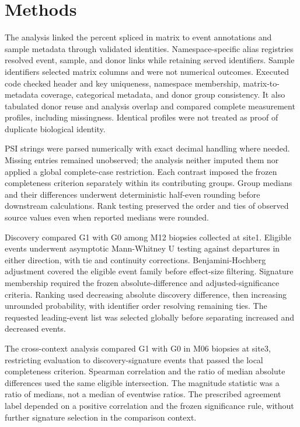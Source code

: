 \documentclass[10pt,a4paper]{article}
\begin{document}
\section*{Methods}
The analysis linked the percent spliced in matrix to event annotations and sample metadata through validated identities. Namespace-specific alias registries resolved event, sample, and donor links while retaining served identifiers. Sample identifiers selected matrix columns and were not numerical outcomes. Executed code checked header and key uniqueness, namespace membership, matrix-to-metadata coverage, categorical metadata, and donor group consistency. It also tabulated donor reuse and analysis overlap and compared complete measurement profiles, including missingness. Identical profiles were not treated as proof of duplicate biological identity.
\par
PSI strings were parsed numerically with exact decimal handling where needed. Missing entries remained unobserved; the analysis neither imputed them nor applied a global complete-case restriction. Each contrast imposed the frozen completeness criterion separately within its contributing groups. Group medians and their differences underwent deterministic half-even rounding before downstream calculations. Rank testing preserved the order and ties of observed source values even when reported medians were rounded.
\par
Discovery compared G1 with G0 among M12 biopsies collected at site1. Eligible events underwent asymptotic Mann-Whitney U testing against departures in either direction, with tie and continuity corrections. Benjamini-Hochberg adjustment covered the eligible event family before effect-size filtering. Signature membership required the frozen absolute-difference and adjusted-significance criteria. Ranking used decreasing absolute discovery difference, then increasing unrounded probability, with identifier order resolving remaining ties. The requested leading-event list was selected globally before separating increased and decreased events.
\par
The cross-context analysis compared G1 with G0 in M06 biopsies at site3, restricting evaluation to discovery-signature events that passed the local completeness criterion. Spearman correlation and the ratio of median absolute differences used the same eligible intersection. The magnitude statistic was a ratio of medians, not a median of eventwise ratios. The prescribed agreement label depended on a positive correlation and the frozen significance rule, without further signature selection in the comparison context.
\end{document}
